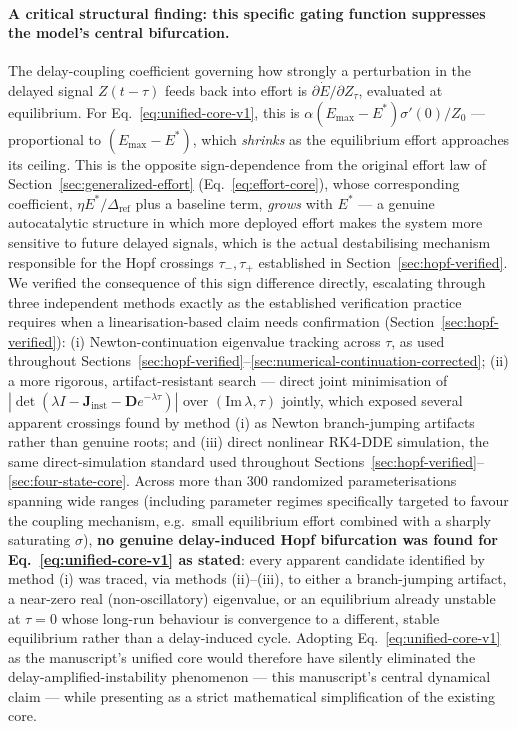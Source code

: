 \documentclass[twocolumn,10pt]{article}
\begin{document}
\paragraph{A critical structural finding: this specific gating function suppresses the model's central bifurcation.} The delay-coupling coefficient governing how strongly a perturbation in the delayed signal $Z(t-\tau)$ feeds back into effort is $\partial\dot E/\partial Z_\tau$, evaluated at equilibrium. For Eq.~\eqref{eq:unified-core-v1}, this is $\alpha(E_{\max}-E^*)\sigma'(0)/Z_0$ --- proportional to $(E_{\max}-E^*)$, which \emph{shrinks} as the equilibrium effort approaches its ceiling. This is the opposite sign-dependence from the original effort law of Section~\ref{sec:generalized-effort} (Eq.~\eqref{eq:effort-core}), whose corresponding coefficient, $\eta E^*/\Delta_{\text{ref}}$ plus a baseline term, \emph{grows} with $E^*$ --- a genuine autocatalytic structure in which more deployed effort makes the system more sensitive to future delayed signals, which is the actual destabilising mechanism responsible for the Hopf crossings $\tau_-,\tau_+$ established in Section~\ref{sec:hopf-verified}. We verified the consequence of this sign difference directly, escalating through three independent methods exactly as the established verification practice requires when a linearisation-based claim needs confirmation (Section~\ref{sec:hopf-verified}): (i) Newton-continuation eigenvalue tracking across $\tau$, as used throughout Sections~\ref{sec:hopf-verified}--\ref{sec:numerical-continuation-corrected}; (ii) a more rigorous, artifact-resistant search --- direct joint minimisation of $|{\det(\lambda I-\mathbf J_{\text{inst}}-\mathbf D e^{-\lambda\tau})}|$ over $(\mathrm{Im}\,\lambda,\tau)$ jointly, which exposed several apparent crossings found by method (i) as Newton branch-jumping artifacts rather than genuine roots; and (iii) direct nonlinear RK4-DDE simulation, the same direct-simulation standard used throughout Sections~\ref{sec:hopf-verified}--\ref{sec:four-state-core}. Across more than $300$ randomized parameterisations spanning wide ranges (including parameter regimes specifically targeted to favour the coupling mechanism, e.g.\ small equilibrium effort combined with a sharply saturating $\sigma$), \textbf{no genuine delay-induced Hopf bifurcation was found for Eq.~\eqref{eq:unified-core-v1} as stated}: every apparent candidate identified by method (i) was traced, via methods (ii)--(iii), to either a branch-jumping artifact, a near-zero real (non-oscillatory) eigenvalue, or an equilibrium already unstable at $\tau=0$ whose long-run behaviour is convergence to a different, stable equilibrium rather than a delay-induced cycle. Adopting Eq.~\eqref{eq:unified-core-v1} as the manuscript's unified core would therefore have silently eliminated the delay-amplified-instability phenomenon --- this manuscript's central dynamical claim --- while presenting as a strict mathematical simplification of the existing core.
\end{document}
